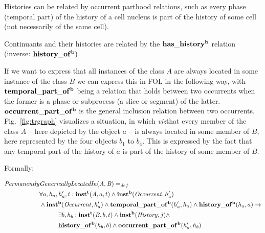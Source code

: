 Histories can be related by occurrent parthood relations, such as every phase (temporal part) 
of the history of a cell nucleus is part of the history of some cell (not necessarily of the same cell).  

Continuants and their histories are related by the $\mathrm{\mathbf{has\_history^b}}$ relation 
(inverse: $\mathrm{\mathbf{history\_of^b}})$.

If we want to express that all instances of the class $A$ are always located in some instance of the 
class $B$ we can express this in FOL in the following way, with $\mathrm{\mathbf{temporal\_part\_of^b}}$ being 
a relation that holds between two occurrents when the former is a phase or subprocess (a slice or 
segment) of the latter. $\mathrm{\mathbf{occurrent\_part\_of^b}}$ is the general inclusion relation between two 
occurrents. Fig.\ \ref{fig:trgraph} visualizes a situation, in which \emph{viz}that every member of the class $A$ 
-- here depicted by the object $a$ -- is always located in some member of $B$, here represented by the 
four objects $b_1$ to $b_4$. This is expressed by the fact that any temporal part of the history of $a$ 
is part of the history of some member of $B$. 


Formally:

\begin{equation}
\begin{split}
\mathit{Permanently} & \mathit{GenericallyLocatedIn}(\mathit{A},\mathit{B})  =_{def}  \\
& \forall a, h_a, h_a', t: \mathrm{\mathbf{inst^t}}(\mathit{A}, a, t) \wedge \mathrm{\mathbf{inst^b}}(\mathit{Occurrent},h_a') \\
& \wedge \mathrm{\mathbf{inst^b}}(\mathit{Occurrent},h_a') \wedge \mathrm{\mathbf{temporal\_part\_of^b}}(h_a', h_a) \wedge \mathrm{\mathbf{history\_of^b}}(h_a, a) \rightarrow \\
& \quad \quad \quad \exists b, h_b: \mathrm{\mathbf{inst^t}}(\mathit{B}, b, t) \wedge \mathrm{\mathbf{inst^b}}(\mathit{History},j) \wedge \\
& \quad \quad \quad \mathrm{\mathbf{history\_of^b}}(h_b, b) \wedge  \mathrm{\mathbf{occurrent\_part\_of^b}}(h_a', h_b) 
\end{split}
\label{eq:history:PartOf}
\end{equation}




